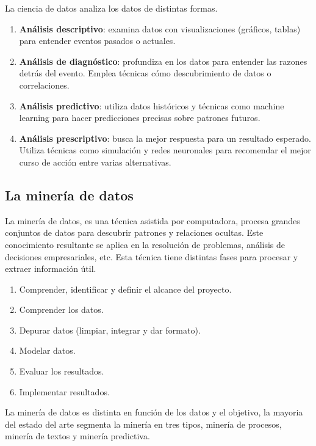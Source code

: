 La ciencia de datos analiza los datos de distintas formas.

\begin{enumerate}
    \item \textbf{Análisis descriptivo}: examina datos con visualizaciones (gráficos, tablas) para entender eventos pasados o actuales.
    \item \textbf{Análisis de diagnóstico}: profundiza en los datos para entender las razones detrás del evento. Emplea técnicas cómo descubrimiento de datos o correlaciones.
    \item \textbf{Análisis predictivo}: utiliza datos históricos y técnicas como machine learning para hacer predicciones precisas sobre patrones futuros.
    \item \textbf{Análisis prescriptivo}: busca la mejor respuesta para un resultado esperado. Utiliza técnicas como simulación y redes neuronales para recomendar el mejor curso de acción entre varias alternativas.
\end{enumerate}


\subsection{La minería de datos}

La minería de datos, es una técnica asistida por computadora, procesa grandes conjuntos de datos para descubrir patrones y relaciones ocultas. Este conocimiento resultante se aplica en la resolución de problemas, análisis de decisiones empresariales, etc. Esta técnica tiene distintas fases para procesar y extraer información útil.

\begin{enumerate}
    \item Comprender, identificar y definir el alcance del proyecto.
    \item Comprender los datos.
    \item Depurar datos (limpiar, integrar y dar formato).
    \item Modelar datos.
    \item Evaluar los resultados.
    \item Implementar resultados.
\end{enumerate}

La minería de datos es distinta en función de los datos y el objetivo, la mayoria del estado del arte segmenta la minería en tres tipos, minería de procesos, minería de textos y minería predictiva.

